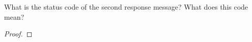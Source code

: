 \documentclass[../../main.tex]{subfiles}
\begin{document}
\begin{wts}
What is the status code of the second response message? What does this code mean? 
\end{wts}
\begin{proof}

\end{proof}
\end{document}
